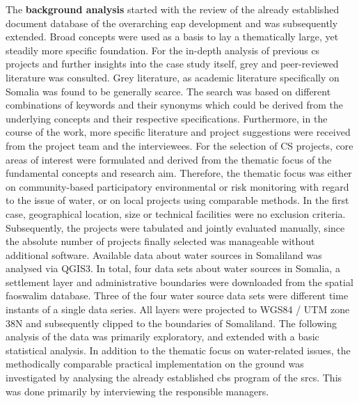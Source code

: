 The \textbf{background analysis} started with the review of the already established document database of the overarching \acrshort{eap} development and was subsequently extended. Broad concepts were used as a basis to lay a thematically large, yet steadily more specific foundation. For the in-depth analysis of previous \acrshort{cs} projects and further insights into the case study itself, grey and peer-reviewed literature was consulted. Grey literature, as academic literature specifically on Somalia was found to be generally scarce. The search was based on different combinations of keywords and their synonyms which could be derived from the underlying concepts and their respective specifications. Furthermore, in the course of the work, more specific literature and project suggestions were received from the project team and the interviewees. For the selection of CS projects, core areas of interest were formulated and derived from the thematic focus of the fundamental concepts and research aim. Therefore, the thematic focus was either on community-based participatory environmental or risk monitoring with regard to the issue of water, or on local projects using comparable methods. In the first case, geographical location, size or technical facilities were no exclusion criteria. Subsequently, the projects were tabulated and jointly evaluated manually, since the absolute number of projects finally selected was manageable without additional software.\newline
Available data about water sources in Somaliland was analysed via QGIS3. In total, four data sets about water sources in Somalia, a settlement layer and administrative boundaries were downloaded from the spatial \acrshort{fao}\acrshort{swalim} database. Three of the four water source data sets were different time instants of a single data series. All layers were projected to WGS84 / UTM zone 38N and subsequently clipped to the boundaries of Somaliland. The following analysis of the data was primarily exploratory, and extended with a basic statistical analysis.\newline %
In addition to the thematic focus on water-related issues, the methodically comparable practical implementation on the ground was investigated by analysing the already established \acrshort{cbs} program of the \acrshort{srcs}. This was done primarily by interviewing the responsible managers.

